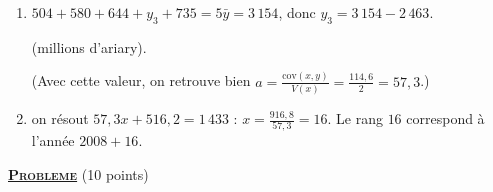 \begin{description}
\begin{enumerate}
				\item {}
					$504 + 580 + 644 + y_3 + 735 = 5\bar{y} = 3\,154$, donc $y_3 = 3\,154 - 2\,463$.

					 (millions d'ariary).

					(Avec cette valeur, on retrouve bien $a = \frac{\mathrm{cov}(x,y)}{V(x)} = \frac{114{,}6}{2} = 57{,}3$.)
				\item {}
					on résout $57{,}3x + 516{,}2 = 1\,433$ : $x = \frac{916{,}8}{57{,}3} = 16$.
					Le rang $16$ correspond à l'année $2008 + 16$.

			\end{enumerate}
	\end{description}
\noindent \underline{\textsc{\textbf{Probleme}}} (10 points)
